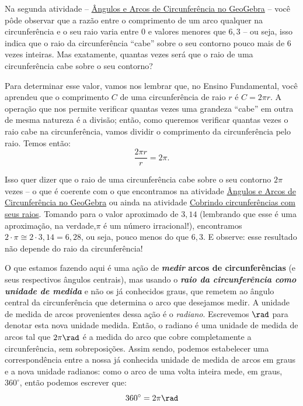 Na segunda atividade – \hyperref[trig-ativ8]{Ângulos e Arcos de Circunferência no GeoGebra} – você pôde observar que a razão entre o comprimento de um arco qualquer na circunferência e o seu raio varia entre $0$ e valores menores que $6{,}3$ – ou seja, isso indica que o raio da circunferência “cabe”{} sobre o seu contorno pouco mais de $6$ vezes inteiras. Mas exatamente, quantas vezes será que o raio de uma circunferência cabe sobre o seu contorno?

Para determinar esse valor, vamos nos lembrar que, no Ensino Fundamental, você aprendeu que o comprimento $C$ de uma circunferência de raio $r$ é $C=2\pi r$. A operação que nos permite verificar quantas vezes uma grandeza “cabe”{} em outra de mesma natureza é a divisão; então, como queremos verificar quantas vezes o raio cabe na circunferência, vamos dividir o comprimento da circunferência pelo raio. Temos então:
\begin{equation*}
\frac{2\pi r}{r}=2\pi.
\end{equation*}

Isso quer dizer que o raio de uma circunferência cabe sobre o seu contorno $2\pi$ vezes – o que é coerente com o que encontramos na atividade \hyperref[trig-ativ8]{Ângulos e Arcos de Circunferência no GeoGebra} ou ainda na atividade \hyperref[trig-ativ7]{Cobrindo circunferências com seus raios}. Tomando para   o valor aproximado de $3{,}14$ (lembrando que esse é uma aproximação, na verdade,$\pi$ é um número irracional!), encontramos $2\cdot\pi\cong2\cdot3{,}14=6{,}28$, ou seja, pouco menos do que $6,3$. E observe: esse resultado não depende do raio da circunferência!

O que estamos fazendo aqui é uma ação de \textbf{\textit{medir} arcos de circunferências} (e seus respectivos ângulos centrais), mas usando o \textbf{\textit{raio da circunferência como unidade de medida}} e não os já conhecidos graus, que remetem ao ângulo central da circunferência que determina o arco que desejamos medir. A unidade de medida de arcos provenientes dessa ação é o \textit{radiano}. Escrevemos $\rad$ para denotar esta nova unidade medida. Então, o radiano é uma unidade de medida de arcos tal que $2\pi \rad$ é a medida do arco que cobre completamente a circunferência, sem sobreposições. Assim sendo, podemos estabelecer uma correspondência entre a nossa já conhecida unidade de medida de arcos em graus e a nova unidade radianos: como o arco de uma volta inteira mede, em graus, $360^{\circ}$, então podemos escrever que:
\begin{equation*}
360^{\circ}=2\pi\rad
\end{equation*}

